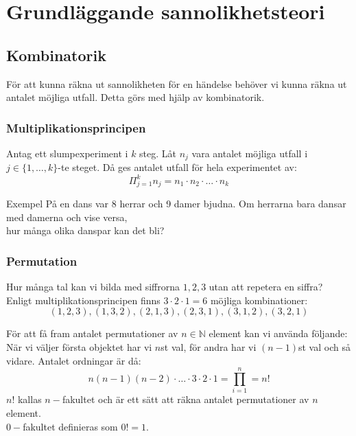\chapter{Grundläggande sannolikhetsteori}

\section{Kombinatorik}
För att kunna räkna ut sannolikheten för en händelse behöver vi kunna räkna ut antalet möjliga utfall. Detta görs med hjälp av kombinatorik.\\

\subsection{Multiplikationsprincipen}
Antag ett slumpexperiment i $k$ steg. Låt $n_j$ vara antalet möjliga utfall i $j\in\{1,\dots,k\}$-te steget. Då ges antalet utfall för hela experimentet av:
$$
	\Pi^k_{j=1}n_j=n_1\cdot n_2\cdot\ldots\cdot n_k
$$
\begin{exempel}{Exempel}
	På en dans var 8 herrar och 9 damer bjudna. Om herrarna bara dansar med damerna och vise versa,\\ hur många olika danspar kan det bli?
\end{exempel}

\subsection{Permutation}
Hur många tal kan vi bilda med siffrorna ${1,2,3}$ utan att repetera en siffra?\\
Enligt multiplikationsprincipen finns $3\cdot2\cdot1=6$ möjliga kombinationer:
$$
	(1,2,3),(1,3,2),(2,1,3),(2,3,1),(3,1,2),(3,2,1)
$$

För att få fram antalet permutationer av $n\in\mathbb{N}$ element kan vi använda följande:\\
När vi väljer första objektet har vi $n$st val, för andra har vi $(n-1)$st val och så vidare. Antalet ordningar är då:
$$
	n(n-1)(n-2)\cdot\ldots\cdot3\cdot2\cdot1=\prod^n_{i=1}=n!
$$
$n!$ kallas $n-$fakultet och är ett sätt att räkna antalet permutationer av $n$ element.\\
$0-$fakultet definieras som $0!=1$.
